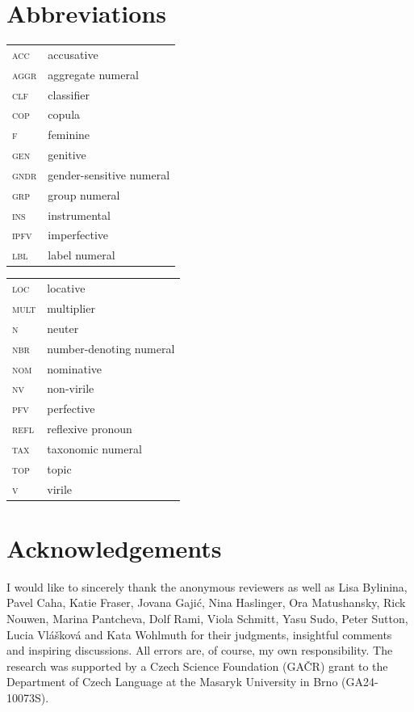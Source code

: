 \documentclass[output=paper]{langscibook}
\begin{document}
	\section*{Abbreviations}

	\begin{tabularx}{.5\textwidth}{@{}lX@{}}
		\textsc{acc}&{accusative}\\
		\textsc{aggr}&{aggregate numeral}\\
		\textsc{clf}&{classifier}\\
		\textsc{cop}&{copula}\\
		\textsc{f}&{feminine}\\
		\textsc{gen}&{genitive}\\
		\textsc{gndr}&{gender-sensitive numeral}\\
        \textsc{grp}&{group numeral}\\
		\textsc{ins}&{instrumental}\\
		\textsc{ipfv}&{imperfective}\\
		\textsc{lbl}&{label numeral}\\
	\end{tabularx}%
	\begin{tabularx}{.5\textwidth}{@{}lX@{}}
		\textsc{loc}&{locative}\\
		\textsc{mult}&{multiplier}\\
		\textsc{n}&{neuter}\\
		\textsc{nbr}&{number-denoting numeral}\\
		\textsc{nom}&{nominative}\\
        \textsc{nv}&{non-virile}\\
		\textsc{pfv}&{perfective}\\
		\textsc{refl}&{reflexive pronoun}\\
		\textsc{tax}&{taxonomic numeral}\\
		\textsc{top}&{topic}\\
		\textsc{v}&{virile}\\
	\end{tabularx}
	
\section*{Acknowledgements}

I would like to sincerely thank the anonymous reviewers as well as Lisa Bylinina, Pavel Caha, Katie Fraser, Jovana Gajić, Nina Haslinger, Ora Matushansky, Rick Nouwen, Marina Pantcheva, Dolf Rami, Viola Schmitt, Yasu Sudo, Peter Sutton, Lucia Vlášková and Kata Wohlmuth for their judgments, insightful comments and inspiring discussions. All errors are, of course, my own responsibility. The research was supported by a Czech Science Foundation (GAČR) grant to the Department of Czech Language at the Masaryk University in Brno (GA24-10073S).
 
	\sloppy
	\printbibliography[heading=subbibliography,notkeyword=this]

    
\end{document}
